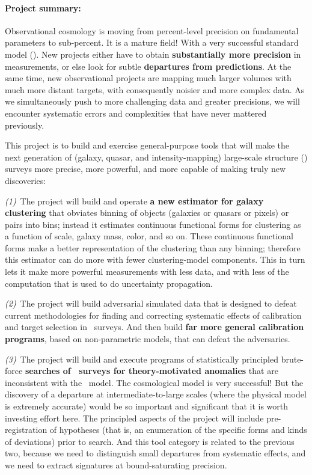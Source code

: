 \documentclass[12pt, fullpage, letterpaper]{article}
\begin{document}
\paragraph{Project summary:}
Observational cosmology is moving from percent-level precision on
fundamental parameters to sub-percent.
It is a mature field! With a very successful standard model
(\LCDM).
New projects either have to obtain \textbf{substantially more
  precision} in measurements, or else look for subtle
\textbf{departures from predictions}.
At the same time, new observational projects are mapping much larger
volumes with much more distant targets, with consequently noisier and
more complex data.
As we simultaneously push to more challenging data and greater
precisions, we will encounter systematic errors and complexities that
have never mattered previously.

This project is to build and exercise general-purpose tools that will
make the next generation of (galaxy, quasar, and intensity-mapping)
large-scale structure (\LSS) surveys more precise, more powerful, and
more capable of making truly new discoveries:

\textsl{(1)}~The project will build and operate \textbf{a new estimator for
galaxy clustering} that obviates binning of objects (galaxies or
quasars or pixels) or pairs into bins; instead it estimates continuous
functional forms for clustering as a function of scale, galaxy mass,
color, and so on.
These continuous functional forms make a better representation of the
clustering than any binning; therefore this estimator can do more with
fewer clustering-model components.
This in turn lets it make more powerful measurements with less data,
and with less of the computation that is used to do uncertainty
propagation.

\textsl{(2)}~The project will build adversarial simulated data that is
designed to defeat current methodologies for finding and correcting
systematic effects of calibration and target selection in \LSS\ 
surveys. And then build \textbf{far more general calibration
programs}, based on non-parametric models, that can defeat the
adversaries.

\textsl{(3)}~The project will build and execute programs of
statistically principled brute-force \textbf{searches of \LSS\ surveys
for theory-motivated anomalies} that are inconsistent with the \LCDM\ model.
The cosmological model is very successful!
But the discovery of a departure at intermediate-to-large scales
(where the physical model is extremely accurate) would be so important
and significant that it is worth investing effort here.
The principled aspects of the project will include pre-registration of
hypotheses (that is, an enumeration of the specific forms and kinds of
deviations) prior to search.
And this tool category is related to the previous two, because we need
to distinguish small departures from systematic effects, and we need
to extract signatures at bound-saturating precision.
\end{document}

